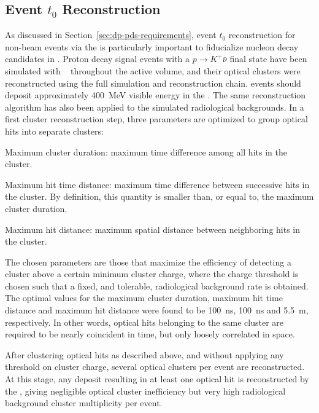 
\subsection{Event $t_{0}$ Reconstruction}
\label{subsec:dp-pds-performance_t0}

As discussed in Section~\ref{sec:dp-pds-requirements}, event $t_0$ reconstruction for non-beam events via the  is particularly important to fiducialize nucleon decay candidates in . Proton decay signal events with a %
$p\rightarrow K^{+} \bar\nu$ final state have been simulated with ~\cite{Andreopoulos:2009rq} throughout the   active volume, and their optical clusters were reconstructed using the full simulation and reconstruction chain.  events should deposit approximately \SI{400}{\MeV} visible energy in the \lar. The same reconstruction algorithm has also been applied to the simulated radiological backgrounds. In a first cluster reconstruction step, three parameters are optimized to group optical hits into separate clusters:
%
\begin{description}
\item Maximum cluster duration: maximum time difference among all  hits in the cluster.
\item Maximum hit time distance: maximum time difference between successive  hits in the cluster. By definition, this quantity is smaller than, or equal to, the maximum cluster duration.
\item Maximum hit distance: maximum spatial distance between neighboring  hits in the cluster. 
\end{description}

The chosen parameters are those that maximize the efficiency of detecting a  cluster above a certain minimum cluster charge, where the charge threshold is chosen such that a fixed, and tolerable, radiological background rate is obtained. The optimal values for the maximum cluster duration, maximum hit time distance and maximum hit distance were found to be \SI{100}{\ns}, \SI{100}{\ns} and \SI{5.5}{\m}, respectively. In other words, optical hits belonging to the same cluster are required to be nearly coincident in time, but only loosely correlated in space.

After clustering optical hits as described above, and without applying any threshold on cluster charge, several optical clusters per event are reconstructed. At this stage, any deposit resulting in at least one optical hit is reconstructed by the , giving negligible  optical cluster inefficiency but very high radiological background cluster multiplicity per event. 

